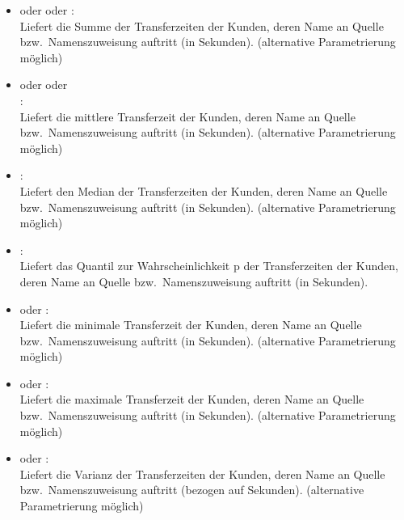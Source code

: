 \begin{itemize}

\item
{} oder  oder :\\
Liefert die Summe der Transferzeiten der Kunden, deren Name an Quelle bzw.\ Namenszuweisung  auftritt (in Sekunden).
(alternative Parametrierung möglich)

\item
{} oder  oder\\
:\\
Liefert die mittlere Transferzeit der Kunden, deren Name an Quelle bzw.\ Namenszuweisung  auftritt (in Sekunden).
(alternative Parametrierung möglich)

\item
{}:\\
Liefert den Median der Transferzeiten der Kunden, deren Name an Quelle bzw.\ Namenszuweisung  auftritt (in Sekunden).
(alternative Parametrierung möglich)

\item
{}:\\
Liefert das Quantil zur Wahrscheinlichkeit p der Transferzeiten der Kunden, deren Name an Quelle bzw.\ Namenszuweisung  auftritt (in Sekunden).

\item
{} oder :\\
Liefert die minimale Transferzeit der Kunden, deren Name an Quelle bzw.\ Namenszuweisung  auftritt (in Sekunden).
(alternative Parametrierung möglich)

\item
{} oder :\\
Liefert die maximale Transferzeit der Kunden, deren Name an Quelle bzw.\ Namenszuweisung  auftritt (in Sekunden).
(alternative Parametrierung möglich)

\item
{} oder :\\
Liefert die Varianz der Transferzeiten der Kunden, deren Name an Quelle bzw.\ Namenszuweisung  auftritt (bezogen auf Sekunden).
(alternative Parametrierung möglich)


\end{itemize}
